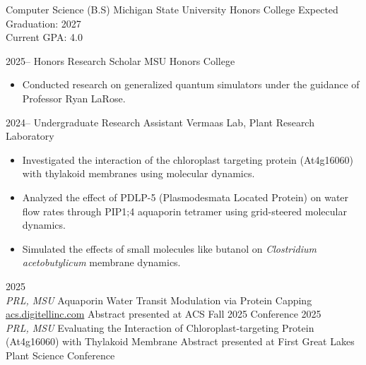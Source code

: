 \documentclass[9pt]{developercv} %
\begin{document}
\vspace{-10 pt}
\begin{entrylist}
    \entry
		{\hspace{10pt}}
		{Computer Science (B.S)}
		{Michigan State University Honors College}
		{Expected Graduation: 2027 \\ 
		Current GPA: 4.0}
\end{entrylist}
\vspace{-10pt}
\begin{entrylist}
	\entry
	{2025--}
	{Honors Research Scholar}
	{MSU Honors College}
	{\vspace{-10pt}
	\begin{itemize}[noitemsep,topsep=0pt,parsep=0pt,partopsep=0pt, leftmargin=7pt]
	\item Conducted research on generalized quantum simulators under the guidance of Professor Ryan LaRose.
	\end{itemize}
	}
	\entry 
		{2024--}
		{Undergraduate Research Assistant}
		{Vermaas Lab, Plant Research Laboratory}
		{\vspace{-10pt}
		\begin{itemize}[noitemsep,topsep=0pt,parsep=0pt,partopsep=0pt, leftmargin=7pt]
			\item Investigated the interaction of the chloroplast targeting protein (At4g16060) with thylakoid membranes using molecular dynamics.
			\item Analyzed the effect of PDLP-5 (Plasmodesmata Located Protein) on water flow rates through PIP1;4 aquaporin tetramer using grid-steered molecular dynamics.
			\item Simulated the effects of small molecules like butanol on \textit{Clostridium acetobutylicum} membrane dynamics. 
		\end{itemize}
		}
\end{entrylist}
\begin{entrylist}
	\entry 
		{2025 \\ \vspace{4pt}\color{gray} \textit{PRL, MSU}}
		{Aquaporin Water Transit Modulation via Protein Capping}
		{\href{https://acs.digitellinc.com/p/s/aquaporin-water-transit-modulation-via-protein-capping-638984}{acs.digitellinc.com}}
		{Abstract presented at ACS Fall 2025 Conference}
	\entry 
		{2025 \\ \vspace{4pt}\color{gray} \textit{PRL, MSU}}
		{Evaluating the Interaction of Chloroplast-targeting Protein (At4g16060) with
		Thylakoid Membrane}
		{}
		{Abstract presented at First Great Lakes Plant Science Conference}
\end{entrylist}
\end{document}
